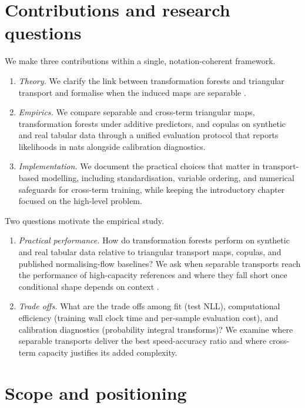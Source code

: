 \documentclass[11pt,a4paper,twoside]{book}\usepackage[]{graphicx}\usepackage[]{xcolor}
\begin{document}
\section{Contributions and research questions}

We make three contributions within a single, notation-coherent framework.
\begin{enumerate}
  \item \emph{Theory.} We clarify the link between transformation forests and triangular transport and formalise when the induced maps are separable \citep{hothorn2017transformation,hothorn2021transformation,hothorn2018conditional}.
  \item \emph{Empirics.} We compare separable and cross-term triangular maps, transformation forests under additive predictors, and copulas on synthetic and real tabular data through a unified evaluation protocol that reports likelihoods in nats alongside calibration diagnostics.
  \item \emph{Implementation.} We document the practical choices that matter in transport-based modelling, including standardisation, variable ordering, and numerical safeguards for cross-term training, while keeping the introductory chapter focused on the high-level problem.
\end{enumerate}

Two questions motivate the empirical study.
\begin{enumerate}
  \item \emph{Practical performance.} How do transformation forests perform on synthetic and real tabular data relative to triangular transport maps, copulas, and published normalising-flow baselines? We ask when separable transports reach the performance of high-capacity references and where they fall short once conditional shape depends on context \citep{rezende2015variational,dinh2017real,papamakarios2021normalizing,hothorn2017transformation,hothorn2021transformation}.
  \item \emph{Trade offs.} What are the trade offs among fit (test NLL), computational efficiency (training wall clock time and per-sample evaluation cost), and calibration diagnostics (probability integral transforms)? We examine where separable transports deliver the best speed-accuracy ratio and where cross-term capacity justifies its added complexity.
\end{enumerate}

\section{Scope and positioning}
\end{document}
